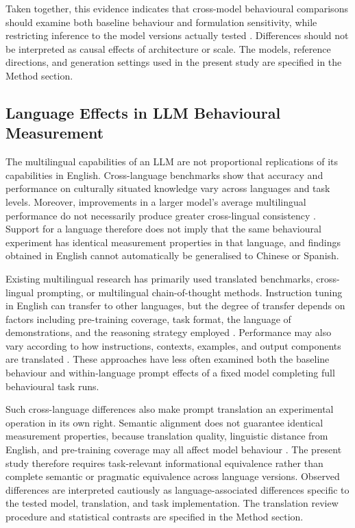 Taken together, this evidence indicates that cross-model behavioural comparisons should examine both baseline behaviour and formulation sensitivity, while restricting inference to the model versions actually tested \cite{Chen2024ChatGPTBehavior,Palmer2024ProprietaryModels}. Differences should not be interpreted as causal effects of architecture or scale. The models, reference directions, and generation settings used in the present study are specified in the Method section.

\subsection{Language Effects in LLM Behavioural Measurement}

The multilingual capabilities of an LLM are not proportional replications of its capabilities in English. Cross-language benchmarks show that accuracy and performance on culturally situated knowledge vary across languages and task levels. Moreover, improvements in a larger model's average multilingual performance do not necessarily produce greater cross-lingual consistency \cite{Zhang2023M3Exam,Qi2023CrossLingualConsistency}. Support for a language therefore does not imply that the same behavioural experiment has identical measurement properties in that language, and findings obtained in English cannot automatically be generalised to Chinese or Spanish.

Existing multilingual research has primarily used translated benchmarks, cross-lingual prompting, or multilingual chain-of-thought methods. Instruction tuning in English can transfer to other languages, but the degree of transfer depends on factors including pre-training coverage, task format, the language of demonstrations, and the reasoning strategy employed \cite{Muennighoff2023CrosslingualGeneralization,Shi2023MultilingualCoT}. Performance may also vary according to how instructions, contexts, examples, and output components are translated \cite{Mondshine2025BeyondEnglish}. These approaches have less often examined both the baseline behaviour and within-language prompt effects of a fixed model completing full behavioural task runs.

Such cross-language differences also make prompt translation an experimental operation in its own right. Semantic alignment does not guarantee identical measurement properties, because translation quality, linguistic distance from English, and pre-training coverage may all affect model behaviour \cite{Mondshine2025BeyondEnglish}. The present study therefore requires task-relevant informational equivalence rather than complete semantic or pragmatic equivalence across language versions. Observed differences are interpreted cautiously as language-associated differences specific to the tested model, translation, and task implementation. The translation review procedure and statistical contrasts are specified in the Method section.

